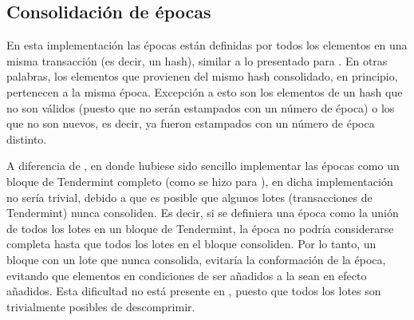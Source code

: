 %




\subsection{Consolidación de épocas}\label{subsubsec:consolidation}

En esta implementación las épocas están definidas por todos los elementos en una misma transacción
(es decir, un hash), similar
a lo presentado para \compresschain.
%
En otras palabras, los elementos que provienen del mismo hash consolidado, en principio,
pertenecen a la misma época.
%
Excepción a esto son los elementos de un hash que no son válidos (puesto que no serán
estampados con un número de época) o los que no son nuevos, es decir, ya fueron estampados
con un número de época distinto.

A diferencia de \compresschain, en donde hubiese sido sencillo implementar las épocas como
un bloque de Tendermint completo (como se hizo para \vanilla), en \hashchain dicha implementación
no sería trivial, debido a que es posible que algunos lotes (transacciones de Tendermint)
nunca consoliden.
%
Es decir, si se definiera una época como la unión de todos los lotes en un bloque de Tendermint,
la época no podría considerarse completa hasta que todos los lotes en el bloque consoliden.
%
Por lo tanto, un bloque con un lote que nunca consolida, evitaría la conformación de la época,
evitando que elementos en condiciones de ser añadidos a la \setchain sean en efecto añadidos.
%
Esta dificultad no está presente en \compresschain, puesto que todos los lotes son trivialmente
posibles de descomprimir.

